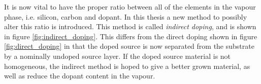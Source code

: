 It is now vital to have the proper ratio between all of the elements in the vapour phase, i.e. silicon, carbon and dopant. In this thesis a new method to possibly alter this ratio is introduced. This method is called \emph{indirect doping}, and is shown in figure \ref{fig:indirect_doping}. This differs from the direct doping shown in figure \ref{fig:direct_doping} in that the doped source is now separated from the substrate by a nominally undoped source layer. If the doped source material is not homogeneous, the indirect method is hoped to give a better grown material, as well as reduce the dopant content in the vapour. 





 
 

 
 

 


 
 
 
 
 
 
 
 
 
 
 
 
 
 
 
 
 
 
 
 
 
 
 
 
 
 
 
 
 
 
 
 
 
 
 
 
 
 
 
 
 
 
 